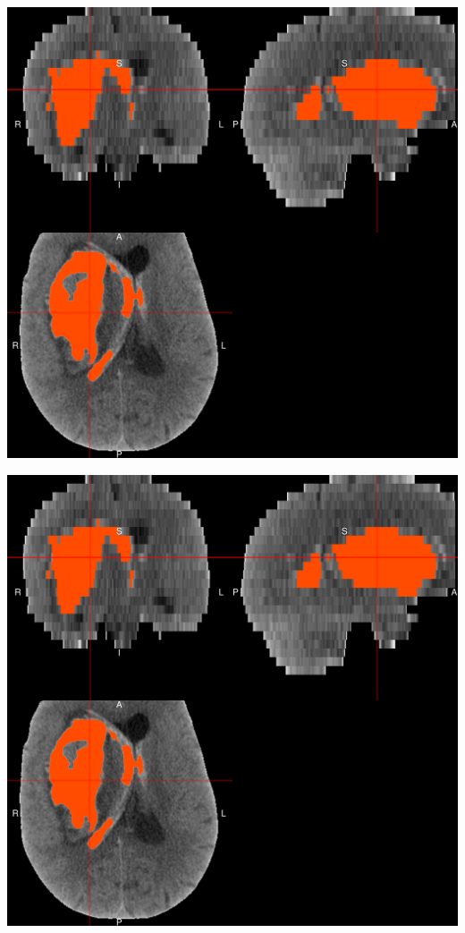 \documentclass{elsarticle_nonatbib}\usepackage[]{graphicx}\usepackage[]{color}
\makeatletter
\def\maxwidth{ %
  \ifdim\Gin@nat@width>\linewidth
    \linewidth
  \else
    \Gin@nat@width
  \fi
}
\newenvironment{knitrout}{}{} %
\makeatother
\begin{document}
\begin{knitrout}
\color{fgcolor}
\includegraphics[width=\maxwidth]{figure/dice_vs_hu-1} 

\end{knitrout}


\begin{knitrout}
\color{fgcolor}
\includegraphics[width=\maxwidth]{figure/dice_vs_ich_cat-1} 

\end{knitrout}
\end{document}
